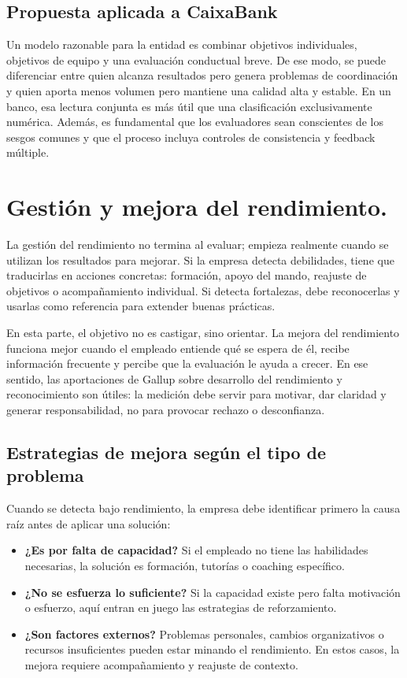 \subsection*{Propuesta aplicada a CaixaBank}
Un modelo razonable para la entidad es combinar objetivos individuales, objetivos de equipo y una evaluación conductual breve. De ese modo, se puede diferenciar entre quien alcanza resultados pero genera problemas de coordinación y quien aporta menos volumen pero mantiene una calidad alta y estable. En un banco, esa lectura conjunta es más útil que una clasificación exclusivamente numérica. Además, es fundamental que los evaluadores sean conscientes de los sesgos comunes y que el proceso incluya controles de consistencia y feedback múltiple.

\section{Gestión y mejora del rendimiento.}

La gestión del rendimiento no termina al evaluar; empieza realmente cuando se utilizan los resultados para mejorar. Si la empresa detecta debilidades, tiene que traducirlas en acciones concretas: formación, apoyo del mando, reajuste de objetivos o acompañamiento individual. Si detecta fortalezas, debe reconocerlas y usarlas como referencia para extender buenas prácticas.

En esta parte, el objetivo no es castigar, sino orientar. La mejora del rendimiento funciona mejor cuando el empleado entiende qué se espera de él, recibe información frecuente y percibe que la evaluación le ayuda a crecer. En ese sentido, las aportaciones de Gallup sobre desarrollo del rendimiento y reconocimiento son útiles: la medición debe servir para motivar, dar claridad y generar responsabilidad, no para provocar rechazo o desconfianza.

\subsection*{Estrategias de mejora según el tipo de problema}
Cuando se detecta bajo rendimiento, la empresa debe identificar primero la causa raíz antes de aplicar una solución:
\begin{itemize}[leftmargin=*]
	\item \textbf{¿Es por falta de capacidad?} Si el empleado no tiene las habilidades necesarias, la solución es formación, tutorías o coaching específico.
	\item \textbf{¿No se esfuerza lo suficiente?} Si la capacidad existe pero falta motivación o esfuerzo, aquí entran en juego las estrategias de reforzamiento.
	\item \textbf{¿Son factores externos?} Problemas personales, cambios organizativos o recursos insuficientes pueden estar minando el rendimiento. En estos casos, la mejora requiere acompañamiento y reajuste de contexto.
\end{itemize}

